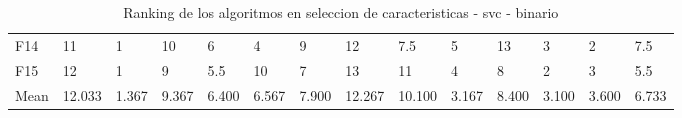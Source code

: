 \begin{table}
\begin{adjustbox}{width=\linewidth}
\begin{tabular}{llllllllllllll}
            F14  & 11     & 1     & 10    & 6     & 4     & 9     & 12     & 7.5    & 5     & 13    & 3     & 2     & 7.5   \\
            F15  & 12     & 1     & 9     & 5.5   & 10    & 7     & 13     & 11     & 4     & 8     & 2     & 3     & 5.5   \\
            Mean & 12.033 & 1.367 & 9.367 & 6.400 & 6.567 & 7.900 & 12.267 & 10.100 & 3.167 & 8.400 & 3.100 & 3.600 & 6.733 \\
            \bottomrule
        \end{tabular}
    \end{adjustbox}
    \caption{Ranking de los algoritmos en seleccion de caracteristicas - svc - binario}
    \label{tab:ranking_sel_rate_bin_svc}
\end{table}

